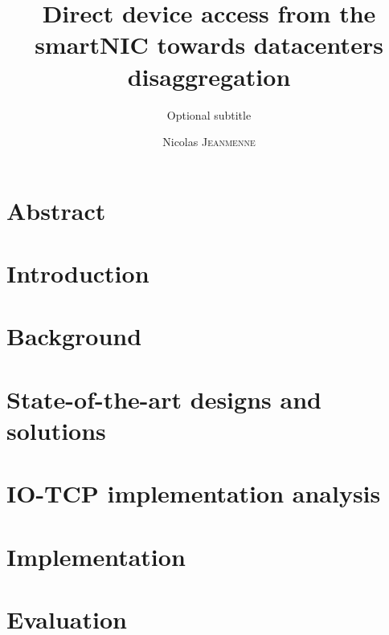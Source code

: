 \documentclass{template/EPL-master-thesis-covers-EN}
\title{Direct device access from the smartNIC towards datacenters disaggregation}
\subtitle{Optional subtitle}
\author{Nicolas \textsc{Jeanmenne}}
\begin{document}
\thispagestyle{empty}
\maketitle

\pagestyle{empty}

\chapter*{Abstract}

    

\setcounter{tocdepth}{4}
\tableofcontents
\newpage

\printglossary[title= List of acronyms, type=\acronymtype]
\newpage

\chapter{Introduction}
\setcounter{page}{1}
\pagestyle{plain}

    


\chapter{Background} \label{ch:background}

    


\chapter{State-of-the-art designs and solutions} \label{ch:sota}

    

\chapter{IO-TCP implementation analysis} \label{ch:io-tcp-analysis}

    

\chapter{Implementation} \label{ch:implementation}

     

\chapter{Evaluation} \label{ch:evaluation}
\end{document}
